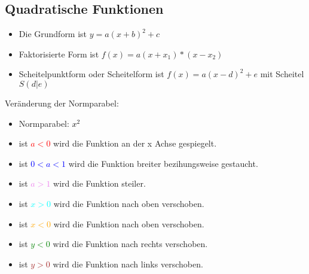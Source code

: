 \newpage
\subsection{Quadratische Funktionen}

\begin{itemize}
    \item Die Grundform ist $y=a(x+b)^2+c$
    \item Faktorisierte Form ist $f(x)=a(x+x_1)*(x-x_2)$
    \item Scheitelpunktform oder Scheitelform ist $f(x)=a(x-d)^2+e$ mit Scheitel $S(d|e)$
\end{itemize}

\hfill \break
Veränderung der Normparabel:
\begin{itemize}
    \item Normparabel: \textcolor{black}{$x^2$}
    \item ist \textcolor{red}{$a<0$} wird die Funktion an der x Achse gespiegelt.
    \item ist \textcolor{blue}{$0<a<1$} wird die Funktion breiter bezihungsweise gestaucht.
    \item ist \textcolor{violet}{$a>1$} wird die Funktion steiler.
    \item ist \textcolor{cyan}{$x>0$} wird die Funktion nach oben verschoben.
    \item ist \textcolor{orange}{$x<0$} wird die Funktion nach oben verschoben.
    \item ist \textcolor{green}{$y<0$} wird die Funktion nach rechts verschoben.
    \item ist \textcolor{brown}{$y>0$} wird die Funktion nach links verschoben.
\end{itemize}

\hfill \break
{}